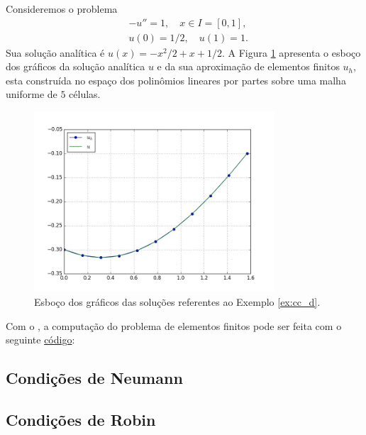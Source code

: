 \begin{ex}\label{ex:cc_d}
  Consideremos o problema
  \begin{align}
    &-u'' = 1,\quad x\in I=[0,1],\label{eq:ex_cc_d_eq}\\
    &u(0) = 1/2,\quad u(1) = 1.\label{eq:ex_cc_d_bc}
  \end{align}
Sua solução analítica é $u(x) = -x^2/2+x+1/2$. A Figura \ref{fig:ex_cc_d} apresenta o esboço dos gráficos da solução analítica $u$ e da sua aproximação de elementos finitos $u_h$, esta construída no espaço dos polinômios lineares por partes sobre uma malha uniforme de $5$ células.

\begin{figure}[h!]
  \centering
  \includegraphics[width=0.8\textwidth]{./cap_mef1d/dados/ex_cc_d/ex_cc_d}
  \caption{Esboço dos gráficos das soluções referentes ao Exemplo \ref{ex:cc_d}.}
  \label{fig:ex_cc_d}
\end{figure}

\ifispython
Com o \fenics, a computação do problema de elementos finitos pode ser feita com o seguinte \href{https://github.com/phkonzen/notas/blob/master/src/MetodoElementosFinitos/cap_mef1d/dados/ex_cc_d/ex_cc_d.py}{código}:

\fi
\end{ex}

\subsection{Condições de Neumann}

\emconstrucao

\subsection{Condições de Robin}

